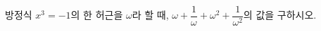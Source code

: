 방정식 $x^3=-1$의 한 허근을 $\omega$라 할 때, $\omega+\dfrac{1}{\omega}+\omega^2+\dfrac{1}{\omega^2}$의 값을 구하시오.
